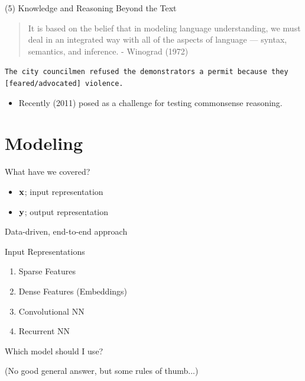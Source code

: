 \documentclass{beamer}
\begin{document}
\begin{frame}{(5) Knowledge and Reasoning Beyond the Text}
\begin{quote}
It is based on the belief that in modeling language understanding, we must deal in an integrated way with all of the aspects of language — syntax, semantics, and inference. {- \normalfont Winograd (1972) }  
\end{quote}


\texttt{The city councilmen refused the demonstrators a permit because they [feared/advocated] violence.}


\begin{itemize}
\item Recently (2011) posed as a challenge for testing commonsense reasoning.  

\end{itemize}
\end{frame}


\section{Modeling}



\begin{frame}
  What have we covered? 
  \begin{itemize}
  \item $\mathbf{x}$; input representation
  \item $\mathbf{y}$; output representation 
  \end{itemize}
  Data-driven, end-to-end approach
\end{frame}

\begin{frame}{Input Representations}
  \begin{enumerate}
  \item Sparse Features
  \item Dense Features (Embeddings)
  \item Convolutional NN
  \item Recurrent NN
  \end{enumerate}
\end{frame}

\begin{frame}
  \begin{center}
    Which model should I use?
  \end{center}
  (No good general answer, but some rules of thumb...)
\end{frame}
\end{document}
